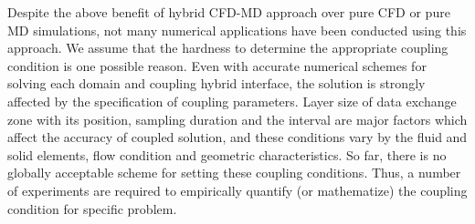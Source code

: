 \documentclass[conference,final]{IEEEtran}
\newcommand{\skonote}[1]{ {\textcolor{blue} { ***Jeff: #1 }}}
\newcommand{\skonote}[1]{}
\begin{document}
Despite the above benefit of hybrid CFD-MD approach over pure CFD or pure MD simulations, not many numerical applications have been conducted using this approach. We assume that the hardness to determine the appropriate coupling condition is one possible reason. Even with accurate numerical schemes for solving each domain and coupling hybrid interface, the solution is strongly affected by the specification of coupling parameters. Layer size of data exchange zone with its position, sampling duration and the interval are major factors which affect the accuracy of coupled solution, and these conditions vary by the fluid and solid elements, flow condition and geometric characteristics. 
So far, there is no globally acceptable scheme for setting these coupling conditions. Thus, a number of experiments are required to empirically quantify (or mathematize) the coupling condition for specific problem.
\newline
\end{document}
